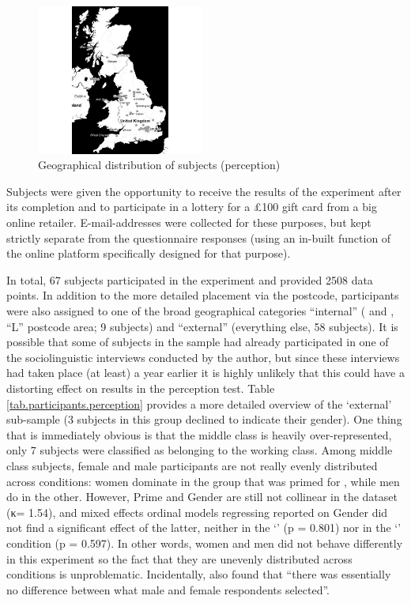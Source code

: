 \begin{figure}[h]
	\centering
	\includegraphics[width=0.49\textwidth]{./figures/participant_map}
	\caption{Geographical distribution of subjects (perception)}
	\label{fig.per.subjects}
\end{figure}

Subjects were given the opportunity to receive the results of the experiment after its completion and to participate in a lottery for a £100 gift card from a big online retailer.
E-mail-addresses were collected for these purposes, but kept strictly separate from the questionnaire responses (using an in-built function of the online platform specifically designed for that purpose).

In total, 67 subjects participated in the experiment and provided 2508 data points.
In addition to the more detailed placement via the postcode, participants were also assigned to one of the broad geographical categories ``internal'' ( and , ``L'' postcode area; 9 subjects) and ``external'' (everything else, 58 subjects).
It is possible that some of subjects in the  sample had already participated in one of the sociolinguistic interviews conducted by the author, but since these interviews had taken place (at least) a year earlier it is highly unlikely that this could have a distorting effect on results in the perception test.
Table \ref{tab.participants.perception} provides a more detailed overview of the `external' sub-sample (3 subjects in this group declined to indicate their gender).
One thing that is immediately obvious is that the middle class is heavily over-represented, only 7 subjects were classified as belonging to the working class.
Among middle class subjects, female and male participants are not really evenly distributed across  conditions: women dominate in the group that was primed for , while men do in the other.
However, Prime and Gender are still not collinear in the dataset (κ= 1.54), and mixed effects ordinal models regressing reported  on Gender did not find a significant effect of the latter, neither in the `' (p = 0.801) nor in the `' condition (p = 0.597).
In other words, women and men did not behave differently in this experiment so the fact that they are unevenly distributed across conditions is unproblematic.
Incidentally, \textcite[69 and 79--80]{niedzielski1999} also found that \enquote{there was essentially no difference between what male and female respondents selected}.

